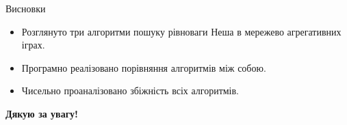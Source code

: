 \documentclass[unicode]{beamer}
\begin{document}
\begin{frame}{Висновки}
\begin{itemize}
    \item Розглянуто три алгоритми пошуку рівноваги Неша в мережево агрегативних іграх.
    \item Програмно реалізовано порівняння алгоритмів між собою.
    \item Чисельно проаналізовано збіжність всіх алгоритмів.
\end{itemize}
\end{frame}

\begin{frame}
    \begin{center}
        \huge{\textbf{Дякую за увагу!}}
    \end{center}
\end{frame}
\end{document}
